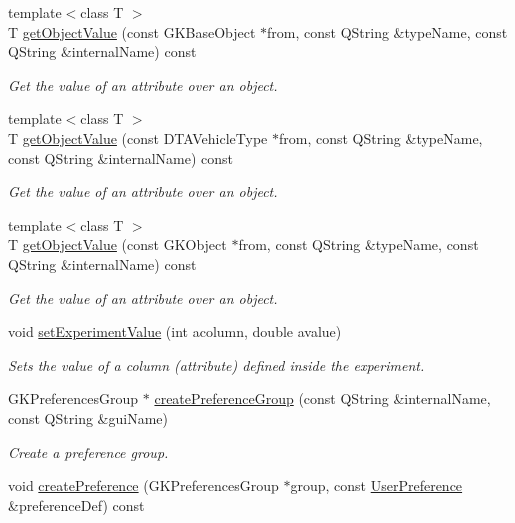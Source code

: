 \begin{DoxyCompactItemize}
{\footnotesize template$<$class T $>$ }\\T \hyperlink{classADynamicAPISetup_a6e72b6afa88ff847c2fe1383eb94a86f}{get\+Object\+Value} (const G\+K\+Base\+Object $\ast$from, const Q\+String \&type\+Name, const Q\+String \&internal\+Name) const 
\begin{DoxyCompactList}\small\item\em Get the value of an attribute over an object. \end{DoxyCompactList}\item 
{\footnotesize template$<$class T $>$ }\\T \hyperlink{classADynamicAPISetup_a875a35d90a1609421c7dbef3dad8db4e}{get\+Object\+Value} (const D\+T\+A\+Vehicle\+Type $\ast$from, const Q\+String \&type\+Name, const Q\+String \&internal\+Name) const 
\begin{DoxyCompactList}\small\item\em Get the value of an attribute over an object. \end{DoxyCompactList}\item 
{\footnotesize template$<$class T $>$ }\\T \hyperlink{classADynamicAPISetup_a34b4b14838d1cffb375be9daad2ba9c8}{get\+Object\+Value} (const G\+K\+Object $\ast$from, const Q\+String \&type\+Name, const Q\+String \&internal\+Name) const 
\begin{DoxyCompactList}\small\item\em Get the value of an attribute over an object. \end{DoxyCompactList}\item 
void \hyperlink{classADynamicAPISetup_a8342d479c2a8e3e3889273be570c8ce9}{set\+Experiment\+Value} (int acolumn, double avalue)
\begin{DoxyCompactList}\small\item\em Sets the value of a column (attribute) defined inside the experiment. \end{DoxyCompactList}\item 
G\+K\+Preferences\+Group $\ast$ \hyperlink{classADynamicAPISetup_ab8281f794f49b827159a68eb3750cd45}{create\+Preference\+Group} (const Q\+String \&internal\+Name, const Q\+String \&gui\+Name)
\begin{DoxyCompactList}\small\item\em Create a preference group. \end{DoxyCompactList}\item 
void \hyperlink{classADynamicAPISetup_aeeb3d01d913a02afe40d49c9ed1fcecd}{create\+Preference} (G\+K\+Preferences\+Group $\ast$group, const \hyperlink{structADynamicAPISetup_1_1UserPreference}{User\+Preference} \&preference\+Def) const 

\end{DoxyCompactItemize}
